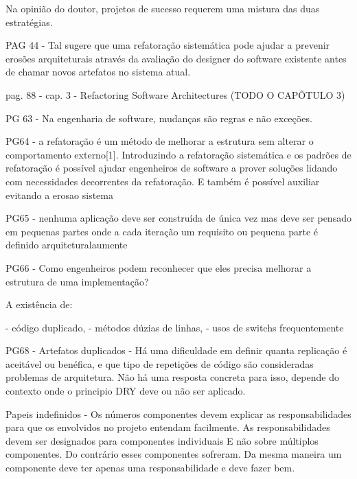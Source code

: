 Na opinião do doutor, projetos de sucesso requerem uma mistura das duas estratégias.



PAG 44 - Tal sugere que uma refatoração sistemática pode ajudar a prevenir erosões arquiteturais através da avaliação do designer do software existente antes de chamar novos artefatos no sistema atual.


















pag. 88 - cap. 3 - Refactoring Software Architectures (TODO O CAPÕTULO 3)


PG 63 - Na engenharia de software, mudanças são regras e não exceções.

PG64 - a refatoração é um método de melhorar a estrutura sem alterar o comportamento externo[1]. Introduzindo a refatoração sistemática e os padrões de refatoração é possível ajudar engenheiros de software a prover soluções lidando com necessidades decorrentes da refatoração. E também é possível auxiliar evitando a erosao sistema


PG65 - nenhuma aplicação deve ser construída de única vez mas deve ser pensado em pequenas partes onde a cada iteração um requisito ou pequena parte é definido arquiteturalaumente


PG66 - Como engenheiros podem reconhecer que eles precisa melhorar a estrutura de uma implementação?

A existência de:

- código duplicado,
- métodos dúzias de linhas,
- usos de switchs frequentemente


PG68 - 
Artefatos duplicados - Há uma dificuldade em definir quanta replicação é aceitável ou benéfica, e que tipo de repetições de código são consideradas problemas de arquitetura. Não há uma resposta concreta para isso, depende do contexto onde o principio DRY deve ou não ser aplicado.

Papeis indefinidos - Os números componentes devem explicar as responsabilidades para que os envolvidos no projeto entendam facilmente. As responsabilidades devem ser designados para componentes individuais E não sobre múltiplos componentes. Do contrário esses componentes sofreram. Da mesma maneira um componente deve ter apenas uma responsabilidade e deve fazer bem.


